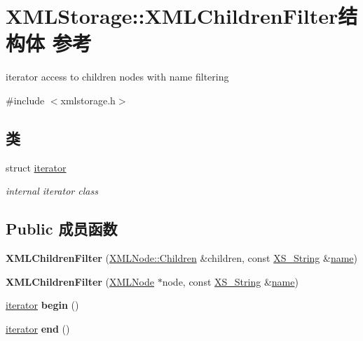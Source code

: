\hypertarget{struct_x_m_l_storage_1_1_x_m_l_children_filter}{}\section{X\+M\+L\+Storage\+:\+:X\+M\+L\+Children\+Filter结构体 参考}
\label{struct_x_m_l_storage_1_1_x_m_l_children_filter}


iterator access to children nodes with name filtering  




{\ttfamily \#include $<$xmlstorage.\+h$>$}

\subsection*{类}
\begin{DoxyCompactItemize}
\item 
struct \hyperlink{struct_x_m_l_storage_1_1_x_m_l_children_filter_1_1iterator}{iterator}
\begin{DoxyCompactList}\small\item\em internal iterator class \end{DoxyCompactList}\end{DoxyCompactItemize}
\subsection*{Public 成员函数}
\begin{DoxyCompactItemize}
\item 
\mbox{\label{struct_x_m_l_storage_1_1_x_m_l_children_filter_ab0e0b53ae79d322bc7217d41f42aa93c}} 
{\bfseries X\+M\+L\+Children\+Filter} (\hyperlink{struct_x_m_l_storage_1_1_x_m_l_node_1_1_children}{X\+M\+L\+Node\+::\+Children} \&children, const \hyperlink{struct_x_m_l_storage_1_1_x_s___string}{X\+S\+\_\+\+String} \&\hyperlink{structname}{name})
\item 
\mbox{\label{struct_x_m_l_storage_1_1_x_m_l_children_filter_abfe1e173dd4e6c4583558ee7eb0ae4d6}} 
{\bfseries X\+M\+L\+Children\+Filter} (\hyperlink{struct_x_m_l_storage_1_1_x_m_l_node}{X\+M\+L\+Node} $\ast$node, const \hyperlink{struct_x_m_l_storage_1_1_x_s___string}{X\+S\+\_\+\+String} \&\hyperlink{structname}{name})
\item 
\mbox{\label{struct_x_m_l_storage_1_1_x_m_l_children_filter_ab7d10057253ebe1986d0b71aaabbb28a}} 
\hyperlink{struct_x_m_l_storage_1_1_x_m_l_children_filter_1_1iterator}{iterator} {\bfseries begin} ()
\item 
\mbox{\label{struct_x_m_l_storage_1_1_x_m_l_children_filter_a35a41c0733748ae2a3ae557733cc5481}} 
\hyperlink{struct_x_m_l_storage_1_1_x_m_l_children_filter_1_1iterator}{iterator} {\bfseries end} ()
\end{DoxyCompactItemize}
